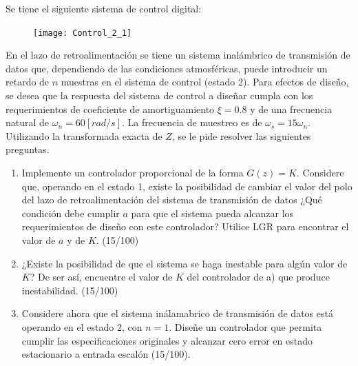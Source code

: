 \documentclass[
  11pt,
  letterpaper,
   addpoints,
   answers
  ]{exam}
\begin{document}
\begin{questions}
    \question Se tiene el siguiente sistema de control digital:
    \begin{figure}[h!]
        \centering
        \texttt{[image: Control\_2\_1]}
    \end{figure}
    En el lazo de retroalimentación se tiene un sistema inalámbrico de transmisión de datos que, dependiendo de las condiciones atmosféricas, puede introducir un retardo de $n$ muestras en el sistema de control (estado 2). Para efectos de diseño, se desea que la respuesta del sistema de control a diseñar cumpla con los requerimientos de coeficiente de amortiguamiento $\xi=0.8$ y de una frecuencia natural de $\omega_n=60 [rad/s]$. La frecuencia de muestreo es de $\omega_s=15\omega_n$. Utilizando la transformada exacta de $Z$, se le pide resolver las siguientes preguntas.
    \begin{enumerate}
    \item Implemente un controlador proporcional de la forma $G(z)=K$. Considere que, operando en el estado 1, existe la posibilidad de cambiar el valor del polo del lazo de retroalimentación del sistema de transmisión de datos ¿Qué condición debe cumplir $a$ para que el sistema pueda alcanzar los requerimientos de diseño con este controlador? Utilice LGR para encontrar el valor de $a$ y de $K$. (15/100)
    \item ¿Existe la posibilidad de que el sistema se haga inestable para algún valor de $K$? De ser así, encuentre el valor de $K$ del controlador de a) que produce inestabilidad. (15/100)
    \item Considere ahora que el sistema inálamabrico de transmisión de datos está operando en el estado 2, con $n=1$. Diseñe un controlador que permita cumplir las especificaciones originales y alcanzar cero error en estado estacionario a entrada escalón (15/100).
    \end{enumerate}
\begin{solution}

\end{solution}
\end{questions}
\end{document}
